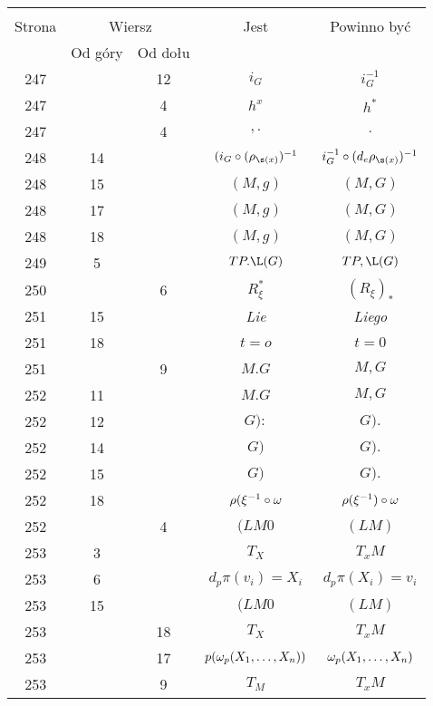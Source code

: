 \documentclass[a4paper,11pt]{article}
\begin{document}
\begin{center}
  \begin{tabular}{|c|c|c|c|c|}
    \hline
    & \multicolumn{2}{c|}{} & & \\
    Strona & \multicolumn{2}{c|}{Wiersz} & Jest
                              & Powinno być \\ \cline{2-3}
    & Od góry & Od dołu & & \\
    \hline
    247 & & 12 & $i_{ G }$ & $i_{ G }^{ -1 }$ \\
    247 & &  4 & $h^{ x }$ & $h^{ * }$ \\
    247 & &  4 & $, .$ & $.$ \\
    248 & 14 & & $( i_{ G } \circ ( \rho_{ \s( x ) } )^{ -1 }$
           & $i_{ G }^{ -1 } \circ ( d_{ e }\rho_{ \s( x ) } )^{ -1 }$ \\
    248 & 15 & & $( M, g )$ & $( M, G )$ \\
    248 & 17 & & $( M, g )$ & $( M, G )$ \\
    248 & 18 & & $( M, g )$ & $( M, G )$ \\
    249 &  5 & & $TP.\L(G)$ & $TP, \L(G)$ \\
    250 & & 6 & $R_{ \xi }^{ * }$ & $( R_{ \xi } )_{ * }$ \\
    251 & 15 & & \emph{Lie} & \emph{Liego} \\
    251 & 18 & & $t = o$ & $t = 0$ \\
    251 & &  9 & $M.G$ & $M, G$ \\
    252 & 11 & & $M.G$ & $M, G$ \\
    252 & 12 & & $G):$ & $G).$ \\
    252 & 14 & & $G)$ & $G).$ \\
    252 & 15 & & $G)$ & $G).$ \\
    252 & 18 & & $\rho( \xi^{ -1 } \circ \omega$ & $\rho( \xi^{ -1 } )
                                                \circ \omega$ \\
    252 & & 4 & $( LM 0$ & $( LM )$ \\
    253 & 3 & & $T_{ X }$ & $T_{ x }M$ \\
    253 & 6 & & $d_{ p } \pi( v_{ i } ) = X_ { i }$
           & $d_{ p } \pi( X_{ i }) = v_ { i }$ \\
    253 & 15 & & $( LM 0$ & $( LM )$ \\
    253 & & 18 & $T_{ X }$ & $T_{ x }M$ \\
    253 & & 17 & $p( \omega_{ p }( X_{ 1 }, \ldots, X_{ n } ) )$
           & $\omega_{ p }( X_{ 1 }, \ldots, X_{ n } )$ \\
    253 & &  9 & $T_{ M }$ & $T_{ x }M$ \\

\end{tabular}
\end{center}
\end{document}
